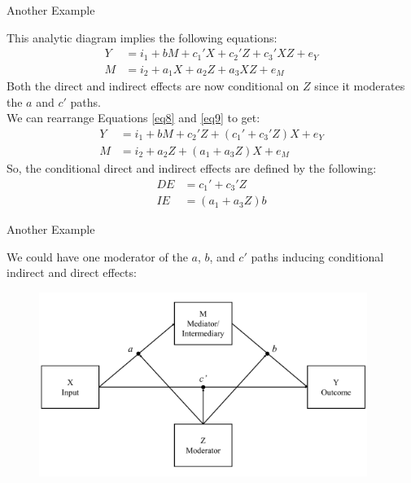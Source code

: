 \documentclass{beamer}
\newcommand{\va}[0]{\vspace{12pt}}
\newcommand{\vb}[0]{\vspace{6pt}}
\begin{document}
\begin{frame}{Another Example}
  
  This analytic diagram implies the following equations:
  \begin{align}
    Y &= i_1 + bM + c_1'X + c_2'Z + c_3'XZ + e_Y \label{eq8}\\
    M &= i_2 + a_1X + a_2Z + a_3XZ + e_M \label{eq9}
  \end{align}
  \pause 
  Both the direct and indirect effects are now conditional on
  $Z$ since it moderates the $a$ and $c'$ paths.\\ 
  \va 
  \pause 
  We can rearrange Equations \ref{eq8} and \ref{eq9} to get:
  \begin{align*}
    Y &= i_1 + bM + c_2'Z + \left( c_1' + c_3'Z \right)X + e_Y\\
    M &= i_2 + a_2Z + \left( a_1 + a_3Z \right)X + e_M
  \end{align*}
  So, the conditional direct and indirect effects are defined by the
  following:
  \begin{align*}
    DE &= c_1' + c_3'Z\\
    IE &= \left(a_1 + a_3Z \right) b
  \end{align*}
  
\end{frame}



\begin{frame}{Another Example}
  
  We could have one moderator of the $a$, $b$, and $c'$ paths inducing
  conditional indirect and direct effects: 
  \vb
  \begin{figure}
    \includegraphics[width=0.95\textwidth]{figures/modABCwithZConceptual.pdf}
  \end{figure}
  
\end{frame}
\end{document}

